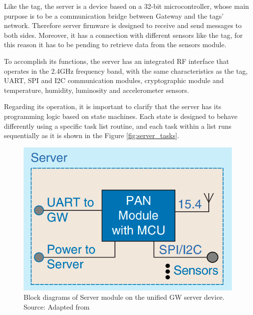 \documentclass[journal]{IEEEtran}	%
\begin{document}
Like the tag, the server is a device based on a 32-bit microcontroller, whose main purpose is to be a communication bridge between Gateway and the tags' network. Therefore server firmware is designed to receive and send messages to both sides. Moreover, it has a connection with different sensors like the tag, for this reason it has to be pending to retrieve data from the sensors module.

To accomplish its functions, the server has an integrated RF interface that operates in the 2.4GHz frequency band, with the same characteristics as the tag, UART, SPI and I2C communication modules, cryptographic module and temperature, humidity, luminosity and accelerometer sensors.

Regarding its operation, it is important to clarify that the server has its programming logic based on state machines. Each state is designed to behave differently using a specific task list routine, and each task within a list runs sequentially as it is shown in the Figure \ref{fig:server_tasks}.

\begin{figure}[H]
\centering
\includegraphics[width=0.9\columnwidth]{fig5.png}
\caption{Block diagrams of Server module on the unified GW server device. Source: Adapted from \cite{williams2017weaving}}
\label{fig:server}
\end{figure}
\end{document}
